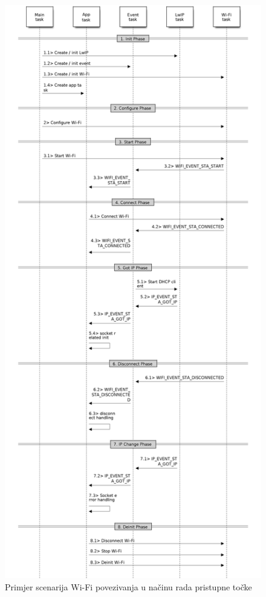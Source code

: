 \begin{figure}[ht]
	\centering
	\includegraphics[scale=0.3]{imgs/station_scenario}
	\caption{Primjer scenarija Wi-Fi povezivanja u načinu rada pristupne točke \cite{espressif}}
	\label{fig:ap_scenario}
\end{figure}


